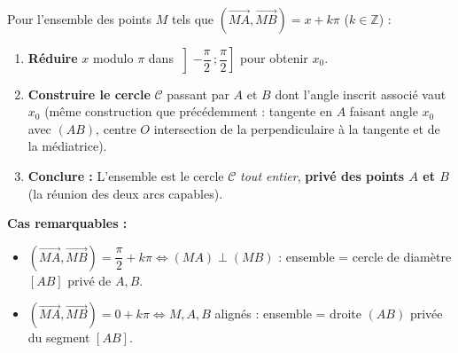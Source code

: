 \documentclass[11pt]{article}
\begin{document}
\begin{methode}
Pour l'ensemble des points $M$ tels que $(\overrightarrow{MA},\overrightarrow{MB})=x+k\pi$ ($k\in\mathbb{Z}$) :
\begin{enumerate}
\item \textbf{Réduire} $x$ modulo $\pi$ dans $\left]-\dfrac{\pi}{2}\,;\dfrac{\pi}{2}\right]$ pour obtenir $x_0$.
\item \textbf{Construire le cercle} $\mathcal{C}$ passant par $A$ et $B$ dont l'angle inscrit associé vaut $x_0$ (même construction que précédemment : tangente en $A$ faisant angle $x_0$ avec $(AB)$, centre $O$ intersection de la perpendiculaire à la tangente et de la médiatrice).
\item \textbf{Conclure :} L'ensemble est le cercle $\mathcal{C}$ \emph{tout entier}, \textbf{privé des points $A$ et $B$} (la réunion des deux arcs capables).
\end{enumerate}
\textbf{Cas remarquables :}
\begin{itemize}
\item $(\overrightarrow{MA},\overrightarrow{MB})=\dfrac{\pi}{2}+k\pi \iff (MA)\perp(MB)$ : ensemble = cercle de diamètre $[AB]$ privé de $A,B$.
\item $(\overrightarrow{MA},\overrightarrow{MB})=0+k\pi \iff M,A,B$ alignés : ensemble = droite $(AB)$ privée du segment $[AB]$.
\end{itemize}
\end{methode}
\end{document}
